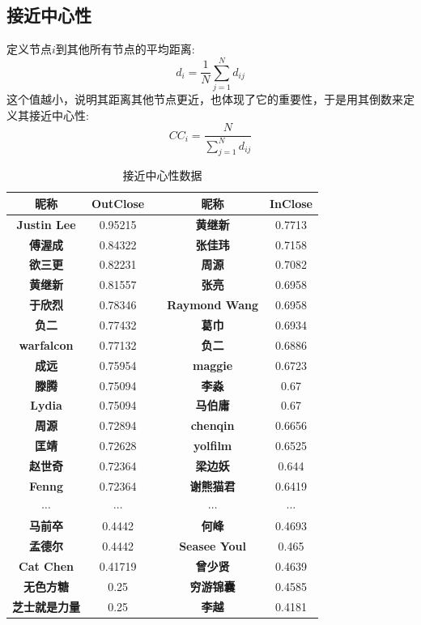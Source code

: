 \documentclass[a4paper]{article}
\begin{document}
\begin{spacing}{1.5}
\subsection{接近中心性}
定义节点$i$到其他所有节点的平均距离:
\[{d_i} = \frac{1}{N}\sum\limits_{j = 1}^N {{d_{ij}}} \]
这个值越小，说明其距离其他节点更近，也体现了它的重要性，于是用其倒数来定义其接近中心性:
\[C{C_i} = \frac{N}{{\sum\limits_{j = 1}^N {{d_{ij}}} }}\]
\begin{table}[htbp]
  \centering
  \caption{接近中心性数据}
    \begin{tabular}{ccccc}
    \toprule
        \textbf{昵称} & OutClose &       & \textbf{昵称} & InClose \\
        \midrule
    \textbf{Justin Lee} & 0.95215 &       & \textbf{黄继新} & 0.7713 \\
    \textbf{傅渥成} & 0.84322 &       & \textbf{张佳玮} & 0.7158 \\
    \textbf{欲三更} & 0.82231 &       & \textbf{周源} & 0.7082 \\
    \textbf{黄继新} & 0.81557 &       & \textbf{张亮} & 0.6958 \\
    \textbf{于欣烈} & 0.78346 &       & \textbf{Raymond Wang} & 0.6958 \\
    \textbf{负二} & 0.77432 &       & \textbf{葛巾} & 0.6934 \\
    \textbf{warfalcon} & 0.77132 &       & \textbf{负二} & 0.6886 \\
    \textbf{成远} & 0.75954 &       & \textbf{maggie} & 0.6723 \\
    \textbf{滕腾} & 0.75094 &       & \textbf{李淼} & 0.67 \\
    \textbf{Lydia} & 0.75094 &       & \textbf{马伯庸} & 0.67 \\
    \textbf{周源} & 0.72894 &       & \textbf{chenqin} & 0.6656 \\
    \textbf{匡靖} & 0.72628 &       & \textbf{yolfilm} & 0.6525 \\
    \textbf{赵世奇} & 0.72364 &       & \textbf{梁边妖} & 0.644 \\
    \textbf{Fenng} & 0.72364 &       & \textbf{谢熊猫君} & 0.6419 \\
     $\cdots$ & $\cdots$  &       & $\cdots$ & $\cdots$     \\
    \textbf{马前卒} & 0.4442 &       & \textbf{何峰} & 0.4693 \\
    \textbf{孟德尔} & 0.4442 &       & \textbf{Seasee Youl} & 0.465 \\
    \textbf{Cat Chen} & 0.41719 &       & \textbf{曾少贤} & 0.4639 \\
    \textbf{无色方糖} & 0.25  &       & \textbf{穷游锦囊} & 0.4585 \\
    \textbf{芝士就是力量} & 0.25  &       & \textbf{李越} & 0.4181 \\
      \bottomrule
    \end{tabular}%
  \label{tab3}%
\end{table}%


\end{spacing}
\end{document}
